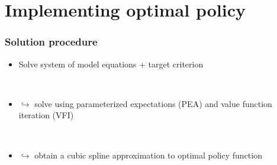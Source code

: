 \documentclass[10pt]{beamer}
\begin{document}
\section{Implementing optimal policy}


\begin{frame}
	\frametitle{Solution procedure}
	
\begin{itemize}
\item[] Solve system of model equations + target criterion 

\

\item[] $\hookrightarrow$ solve using parameterized expectations (PEA) and value function iteration (VFI)

\


\item[] $\hookrightarrow$ obtain a cubic spline approximation to optimal policy function

\

\end{itemize}


\end{frame}
\end{document}
